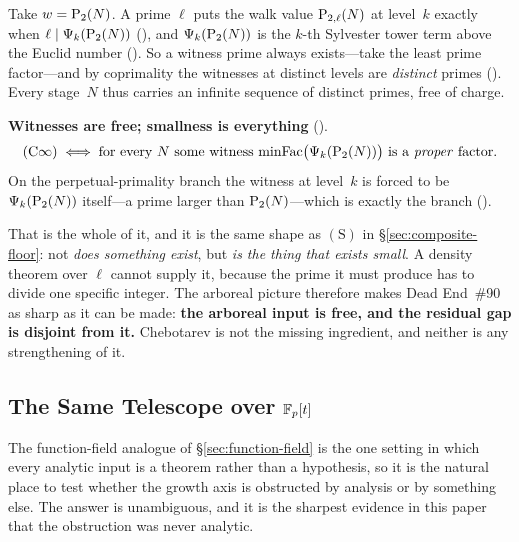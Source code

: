 Take $w = \mathrm{P}_{2}(N)$.  A prime $\ell$ puts the walk value
$\mathrm{P}_{2,\ell}(N)$ at level~$k$ exactly when $\ell \mid \Psi_k(\mathrm{P}_{2}(N))$
(), and
$\Psi_k(\mathrm{P}_{2}(N))$ is the $k$-th Sylvester tower term above the Euclid
number ().  So a
witness prime always exists---take the least prime factor---and by
coprimality the witnesses at distinct levels are \emph{distinct} primes
().  Every
stage~$N$ thus carries an infinite sequence of distinct primes, free of
charge.

\begin{keyresult}
\textbf{Witnesses are free; smallness is everything}
().
\[
  (\mathrm{C}\infty)
  \iff
  \text{for every } N \text{ some witness } \mathrm{minFac}\bigl(\Psi_k(\mathrm{P}_{2}(N))\bigr)
  \text{ is a \emph{proper} factor.}
\]
On the perpetual-primality branch the witness at level~$k$ is forced to be
$\Psi_k(\mathrm{P}_{2}(N))$ itself---a prime larger than $\mathrm{P}_{2}(N)$---which is
exactly the branch
().
\end{keyresult}

\noindent
That is the whole of it, and it is the same shape as $(\mathrm{S})$ in
\S\ref{sec:composite-floor}: not \emph{does something exist}, but \emph{is
the thing that exists small}.  A density theorem over $\ell$ cannot supply
it, because the prime it must produce has to divide one specific integer.
The arboreal picture therefore makes Dead End~\#90 as sharp as it can be
made: \textbf{the arboreal input is free, and the residual gap is disjoint
from it.}  Chebotarev is not the missing ingredient, and neither is any
strengthening of it.


\subsection{The Same Telescope over $\mathbb{F}_p[t]$}
\label{sec:ff-telescope}

The function-field analogue of \S\ref{sec:function-field} is the one
setting in which every analytic input is a theorem rather than a
hypothesis, so it is the natural place to test whether the growth axis is
obstructed by analysis or by something else.  The answer is unambiguous,
and it is the sharpest evidence in this paper that the obstruction was
never analytic.

